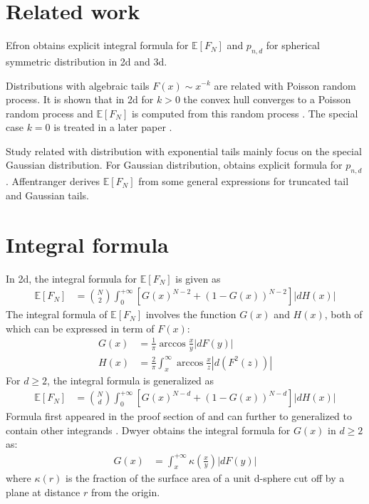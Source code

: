 \documentclass{aptpub}
\def\E{\mathbb{E}}
\begin{document}
\section{Related work}

Efron \cite{efron1965convex} obtains explicit integral formula for $\E[F_N]$ and $p_{n,d}$ 
for spherical symmetric distribution in 2d and 3d.

Distributions with algebraic tails $F(x) \sim x^{-k}$ are related with Poisson random process.
It is shown that in 2d for $k>0$ the convex hull converges to a Poisson random process and $\E[F_N]$ is
computed from this random process \cite{davis1987convex}. The special case $k=0$ is treated in a later paper
\cite{aldous1991number}.

Study related with distribution with exponential tails mainly focus on the special Gaussian distribution.
For Gaussian distribution, \cite{kabluchko2020absorption} obtains explicit formula for $p_{n,d}$.
Affentranger \cite{affentranger1991convex} derives $\E[F_N]$ from some general expressions for truncated tail and Gaussian tails.

\section{Integral formula}\label{sec:int_f}
In 2d, the integral formula for $\E[F_N]$ is given as
\begin{align}
     \E[F_N] &= \binom{N}{2} \int_0^{+\infty} 
     \left[G(x)^{N-2} + (1-G(x))^{N-2} \right]|dH(x)| 
     \label{eq:E_F_N_2_d}
\end{align}
The integral formula of $\E[F_N]$ involves the function $G(x)$ and $H(x)$,
both of which can be expressed in term of $F(x)$:
\begin{align}
   G(x) &=\frac{1}{\pi} \arccos\frac{x}{y} |dF(y)| \\
     H(x) &= \frac{2}{\pi} \int_x^{\infty} \arccos \frac{x}{z} |d(F^2(z))|
     \label{eq:H_expression_2_dim}
\end{align}
For $d\geq 2$, the integral formula is generalized as
\begin{align}
     \E[F_N] &= \binom{N}{d} \int_0^{+\infty} 
     \left[G(x)^{N-d} + (1-G(x))^{N-d} \right]|dH(x)| 
     \label{eq:E_F_N_d}
\end{align}
Formula first appeared in the proof section of \cite{raynaud1970enveloppe}
and can further to generalized to contain other integrands \cite{barany2008random}.
Dwyer obtains the integral formula for $G(x)$ in $d\geq 2$ as:
\begin{align}\label{eq:G_d_kappa}
     G(x) & = \int_x^{+\infty} \kappa(\frac{x}{y}) |dF(y)|
\end{align}
where $\kappa(r)$ is the fraction of the surface area of a unit d-sphere
cut off by a plane at distance $r$ from the origin.
\end{document}
